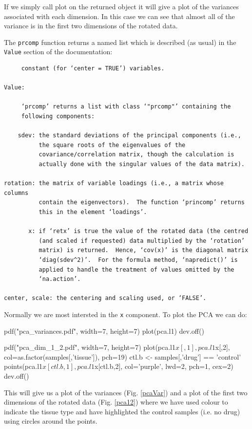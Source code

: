 \documentclass[11pt]{article}
\begin{document}
If we simply call plot on the returned object it will give a plot of the
variances associated with each dimension. In this case we can see that
almost all of the variance is in the first two dimensions of the 
rotated data.

The \texttt{prcomp} function returns a named list which is described (as
usual) in the \texttt{Value} section of the documentation:

\begin{verbatim}
     constant (for ‘center = TRUE’) variables.

Value:

     ‘prcomp’ returns a list with class ‘"prcomp"’ containing the
     following components:

    sdev: the standard deviations of the principal components (i.e.,
          the square roots of the eigenvalues of the
          covariance/correlation matrix, though the calculation is
          actually done with the singular values of the data matrix).

rotation: the matrix of variable loadings (i.e., a matrix whose columns
          contain the eigenvectors).  The function ‘princomp’ returns
          this in the element ‘loadings’.

       x: if ‘retx’ is true the value of the rotated data (the centred
          (and scaled if requested) data multiplied by the ‘rotation’
          matrix) is returned.  Hence, ‘cov(x)’ is the diagonal matrix
          ‘diag(sdev^2)’.  For the formula method, ‘napredict()’ is
          applied to handle the treatment of values omitted by the
          ‘na.action’.

center, scale: the centering and scaling used, or ‘FALSE’.
\end{verbatim}

Normally we are most intersted in the \texttt{x} component. To plot the PCA
we can do:

\begin{rcode}
 pdf("pca_variances.pdf", width=7, height=7)
 plot(pca.l1)
 dev.off()

 pdf("pca_dim_1_2.pdf", width=7, height=7)
 plot(pca.l1$x[,1], pca.l1$x[,2], col=as.factor(samples[,'tissue']),
      pch=19)
 ctl.b <- samples[,'drug'] == 'control'
 points(pca.l1$x[ctl.b,1], pca.l1$x[ctl.b,2], col='purple', 
      lwd=2, pch=1, cex=2)
 dev.off()
\end{rcode}

This will give us a plot of the variances (Fig. \ref{pcaVar}) and a plot
of the first two dimensions of the rotated data (Fig. \ref{pca12}) where
we have used colour to indicate the tissue type and have highlighted
the control samples (i.e. no drug) using circles around the points.
\end{document}
